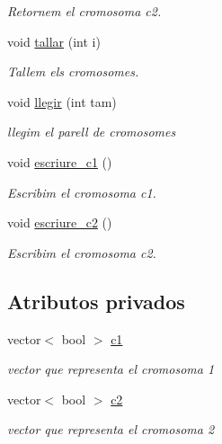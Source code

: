 \begin{DoxyCompactItemize}
\begin{DoxyCompactList}\small\item\em Retornem el cromosoma c2. \end{DoxyCompactList}\item 
void \hyperlink{classparell__cromosomes_a3192f21452f2885d61032eb547cb4a15}{tallar} (int i)
\begin{DoxyCompactList}\small\item\em Tallem els cromosomes. \end{DoxyCompactList}\item 
void \hyperlink{classparell__cromosomes_a3217cc5eb83e77521b28f091c7cf5a5a}{llegir} (int tam)
\begin{DoxyCompactList}\small\item\em llegim el parell de cromosomes \end{DoxyCompactList}\item 
void \hyperlink{classparell__cromosomes_a1bd9e226b1fe9d3e02302e9230c8b928}{escriure\+\_\+c1} ()
\begin{DoxyCompactList}\small\item\em Escribim el cromosoma c1. \end{DoxyCompactList}\item 
void \hyperlink{classparell__cromosomes_a109c96b0eb5e9c63ec97fa0b1e62c252}{escriure\+\_\+c2} ()
\begin{DoxyCompactList}\small\item\em Escribim el cromosoma c2. \end{DoxyCompactList}\end{DoxyCompactItemize}
\subsection*{Atributos privados}
\begin{DoxyCompactItemize}
\item 
vector$<$ bool $>$ \hyperlink{classparell__cromosomes_ab4d7cfc40f53a1698b4ea3ef1f2cd199}{c1}
\begin{DoxyCompactList}\small\item\em vector que representa el cromosoma 1 \end{DoxyCompactList}\item 
vector$<$ bool $>$ \hyperlink{classparell__cromosomes_a888f09ecbc3329b0ee505fb0cb8bf98f}{c2}
\begin{DoxyCompactList}\small\item\em vector que representa el cromosoma 2 \end{DoxyCompactList}\end{DoxyCompactItemize}


